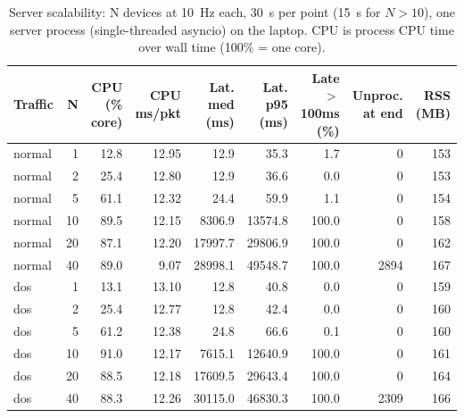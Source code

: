 \begin{table}[t]
\centering
\caption{Server scalability: N devices at 10~Hz each, 30~s per point (15~s for $N>10$), one server process (single-threaded asyncio) on the laptop. CPU is process CPU time over wall time (100\% = one core).}
\label{tab:sys_scalability}
\scriptsize
\begin{tabular}{lrrrrrrrr}
\toprule
Traffic & N & CPU (\% core) & CPU ms/pkt & Lat. med (ms) & Lat. p95 (ms) & Late $>$100ms (\%) & Unproc. at end & RSS (MB) \\
\midrule
normal & 1 & 12.8 & 12.95 & 12.9 & 35.3 & 1.7 & 0 & 153 \\
normal & 2 & 25.4 & 12.80 & 12.9 & 36.6 & 0.0 & 0 & 153 \\
normal & 5 & 61.1 & 12.32 & 24.4 & 59.9 & 1.1 & 0 & 154 \\
normal & 10 & 89.5 & 12.15 & 8306.9 & 13574.8 & 100.0 & 0 & 158 \\
normal & 20 & 87.1 & 12.20 & 17997.7 & 29806.9 & 100.0 & 0 & 162 \\
normal & 40 & 89.0 & 9.07 & 28998.1 & 49548.7 & 100.0 & 2894 & 167 \\
dos & 1 & 13.1 & 13.10 & 12.8 & 40.8 & 0.0 & 0 & 159 \\
dos & 2 & 25.4 & 12.77 & 12.8 & 42.4 & 0.0 & 0 & 160 \\
dos & 5 & 61.2 & 12.38 & 24.8 & 66.6 & 0.1 & 0 & 160 \\
dos & 10 & 91.0 & 12.17 & 7615.1 & 12640.9 & 100.0 & 0 & 161 \\
dos & 20 & 88.5 & 12.18 & 17609.5 & 29643.4 & 100.0 & 0 & 164 \\
dos & 40 & 88.3 & 12.26 & 30115.0 & 46830.3 & 100.0 & 2309 & 166 \\
\bottomrule
\end{tabular}
\end{table}
